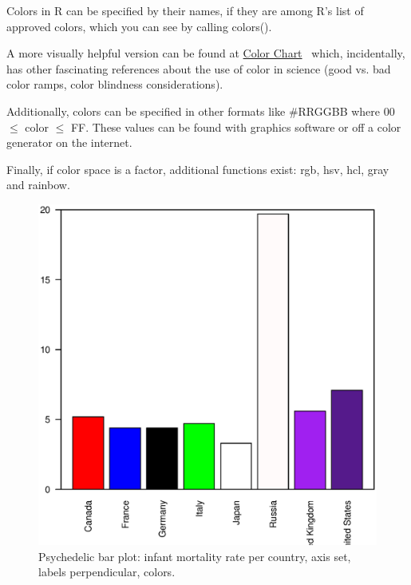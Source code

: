 \documentclass{report}
\newcommand{\code}[1]{\textsf{\ttfamily #1}}
\begin{document}
	\begin{tcolorbox}[title=Colors in R, parbox=false]
Colors in R can be specified by their names, if they are among R's list of approved colors, which you can see by calling \code{colors()}.

A more visually helpful version can be found at \href{http://research.stowers.org/mcm/efg/R/Color/Chart/}{Color Chart}~\cite{rcolors} which, incidentally, has other fascinating references about the use of color in science (good vs. bad color ramps, color blindness considerations).

Additionally, colors can be specified in other formats like \code{\#RRGGBB} where 00 $\leq$ color $\leq$ FF. These values can be found with graphics software or off a color generator on the internet.

Finally, if color space is a factor, additional functions exist: \code{rgb}, \code{hsv}, \code{hcl}, \code{gray} and \code{rainbow}.
	\end{tcolorbox}

	\begin{figure}[h]
		\centering
		\includegraphics[width=1.0\textwidth]{barpsych.eps}
		\caption{Psychedelic bar plot: infant mortality rate per country, axis set, labels perpendicular, colors.}
		\label{fig:barpsych}
	\end{figure}
\end{document}
